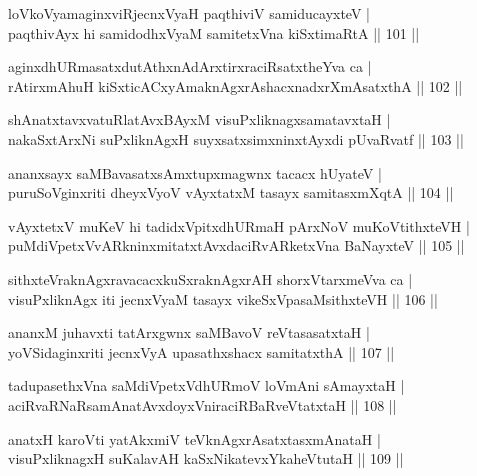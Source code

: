 
\begin{shl}
loVkoV\s yamaginxviRjecnxVyaH paqthiviV samiducayxteV | \\
paqthivAyx hi samidodhxV\s yaM samitetxVna kiSxtimaRtA \hfill|| 101 || 
\end{shl}

\begin{shl}
aginxdhURmasatxdutAthxnAdArxtirxraciRsatxtheYva ca | \\
rAtirxmAhuH kiSxticACxyAmaknAgxrAshacxnadxrXmAsatxthA \hfill|| 102 || 
\end{shl}

\begin{shl}
shAnatxtavxvatuRlatAvxBAyxM visuPxliknagxsamatavxtaH | \\
nakaSxtArxNi suPxliknAgxH suyxsatxsimxninxtAyxdi pUvaRvatf \hfill|| 103 || 
\end{shl}

\begin{shl}
ananxsayx saMBavasatxsAmxtupxmagwnx tacacx hUyateV | \\
puruSoV\s ginxriti dheyxVyoV vAyxtatxM tasayx samitasxmXqtA \hfill|| 104 || 
\end{shl}

\begin{shl}
vAyxtetxV muKeV hi tadidxVpitxdhURmaH pArxNoV muKoVtithxteVH | \\
puMdiVpetxVvARkninxmitatxtAvxdaciRvARketxVna BaNayxteV \hfill|| 105 || 
\end{shl}

\begin{shl}
sithxteVraknAgxravacacxkuSxraknAgxrAH shorxVtarxmeVva ca | \\
visuPxliknAgx iti jecnxVyaM tasayx vikeSxVpasaMsithxteVH \hfill|| 106 || 
\end{shl}

\begin{shl}
ananxM juhavxti tatArxgwnx saMBavoV reVtasasatxtaH | \\
yoVSidaginxriti jecnxVyA upasathxshacx samitatxthA \hfill|| 107 || 
\end{shl}

\begin{shl}
tadupasethxVna saMdiVpetxVdhURmoV loVmAni sAmayxtaH | \\
aciRvaRNaRsamAnatAvxdoyxVniraciRBaRveVtatxtaH \hfill|| 108 || 
\end{shl}

\begin{shl}
anatxH karoVti yatAkxmiV teV\s knAgxrAsatxtasxmAnataH | \\
visuPxliknagxH suKalavAH kaSxNikatevxYkaheVtutaH \hfill|| 109 || 
\end{shl}

